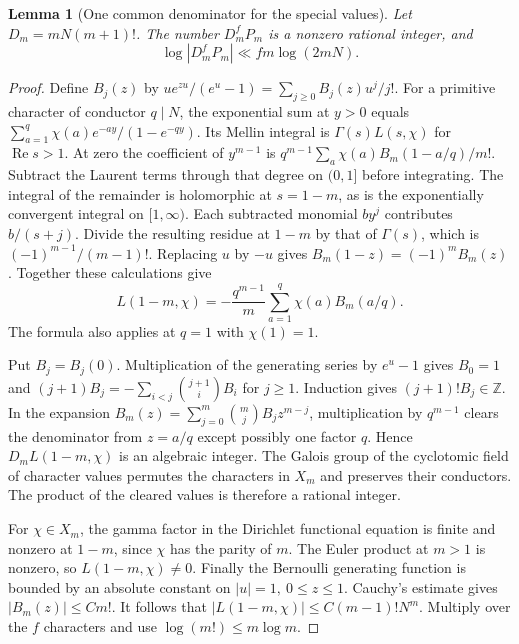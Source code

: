 \documentclass[a4paper,11pt]{article}
\newtheorem{lemma}[proposition]{Lemma}
\theoremstyle{definition}
\theoremstyle{remark}
\newcommand{\ZZ}{\mathbb Z}\newcommand{\ord}{\operatorname{ord}}
\newcommand{\real}{\operatorname{Re}}\newcommand{\imag}{\operatorname{Im}}
\numberwithin{equation}{section}
\begin{document}
\begin{lemma}[One common denominator for the special values]\label{lem:bern99}
Let \(D_m=mN(m+1)!\). The number \(D_m^fP_m\) is a nonzero
rational integer, and
\[
                    \log |D_m^fP_m|\ll f m\log(2mN).
\]
\end{lemma}
\begin{proof}
Define \(B_j(z)\) by
\(u e^{zu}/(e^u-1)=\sum_{j\ge0}B_j(z)u^j/j!\).
For a primitive character of conductor \(q\mid N\), the exponential
sum at \(y>0\) equals
\(\sum_{a=1}^q\chi(a)e^{-ay}/(1-e^{-qy})\).
Its Mellin integral is \(\Gamma(s)L(s,\chi)\) for \(\real s>1\).
At zero the coefficient of \(y^{m-1}\) is
\(q^{m-1}\sum_a\chi(a)B_m(1-a/q)/m!\).
Subtract the Laurent terms through that degree on \((0,1]\) before
integrating. The integral of the remainder is holomorphic at
\(s=1-m\), as is the exponentially convergent integral on
\([1,\infty)\). Each subtracted monomial \(b y^j\) contributes
\(b/(s+j)\). Divide the resulting residue at \(1-m\) by that of
\(\Gamma(s)\), which is \((-1)^{m-1}/(m-1)!\).
Replacing \(u\) by \(-u\) gives \(B_m(1-z)=(-1)^m B_m(z)\).
Together these calculations give
\[
             L(1-m,\chi)=-\frac{q^{m-1}}{m}
                       \sum_{a=1}^q\chi(a)B_m(a/q).
\]
The formula also applies at \(q=1\) with \(\chi(1)=1\).

Put \(B_j=B_j(0)\). Multiplication of the generating series by
\(e^u-1\) gives \(B_0=1\) and
\((j+1)B_j=-\sum_{i<j}\binom{j+1}{i}B_i\) for \(j\ge1\).
Induction gives \((j+1)!B_j\in\ZZ\). In the expansion
\(B_m(z)=\sum_{j=0}^m\binom mj B_j z^{m-j}\), multiplication by
\(q^{m-1}\) clears the denominator from \(z=a/q\) except possibly
one factor \(q\). Hence \(D_m L(1-m,\chi)\) is an algebraic integer.
The Galois group of the cyclotomic field of character values permutes
the characters in \(X_m\) and preserves their conductors. The product
of the cleared values is therefore a rational integer.

For \(\chi\in X_m\), the gamma factor in the Dirichlet functional
equation is finite and nonzero at \(1-m\), since \(\chi\) has the
parity of \(m\). The Euler product at \(m>1\) is nonzero, so
\(L(1-m,\chi)\ne0\). Finally the Bernoulli generating function is
bounded by an absolute constant on \(|u|=1,\ 0\le z\le1\).
Cauchy's estimate gives \(|B_m(z)|\le C m!\). It follows that
\(|L(1-m,\chi)|\le C(m-1)!N^m\). Multiply over the \(f\)
characters and use \(\log(m!)\le m\log m\).
\end{proof}
\end{document}

